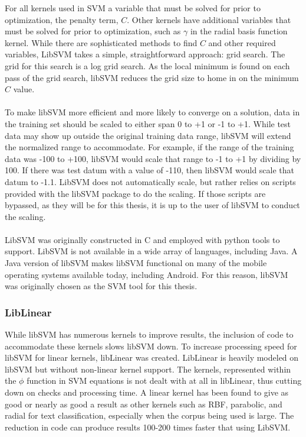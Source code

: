 		For all kernels used in SVM a variable that must be solved for prior to optimization, the penalty term, $C$.  Other kernels have additional variables that must be solved for prior to optimization, such as $\gamma$ in the radial basis function kernel.  While there are sophisticated methods to find $C$ and other required variables, LibSVM takes a simple, straightforward approach: grid search.  The grid for this search is a log grid search.  As the local minimum is found on each pass of the grid search, libSVM reduces the grid size to home in on the minimum $C$ value.  

			\paragraph{} To make libSVM more efficient and more likely to converge on a solution, data in the training set should be scaled to either span 0 to +1 or -1 to +1.  While test data may show up outside the original training data range, libSVM will extend the normalized range to accommodate.  For example, if the range of the training data was -100 to +100, libSVM would scale that range to -1 to +1 by dividing by 100.  If there was test datum with a value of -110, then libSVM would scale that datum to -1.1.  LibSVM does not automatically scale, but rather relies on scripts provided with the libSVM package to do the scaling.  If those scripts are bypassed, as they will be for this thesis, it is up to the user of libSVM to conduct the scaling.
		
			\paragraph{} LibSVM was originally constructed in C and employed with python tools to support.  LibSVM is not available in a wide array of languages, including Java.  A Java version of libSVM makes libSVM functional on many of the mobile operating systems available today, including Android.  For this reason, libSVM was originally chosen as the SVM tool for this thesis.


		\subsubsection{LibLinear}  While libSVM has numerous kernels to improve results, the inclusion of code to accommodate these kernels slows libSVM down.  To increase processing speed for libSVM for linear kernels, libLinear was created.  LibLinear is heavily modeled on libSVM but without non-linear kernel support.  The kernels, represented within the $\phi$ function in SVM equations is not dealt with at all in libLinear, thus cutting down on checks and processing time.   A linear kernel has been found to give as good or nearly as good a result as other kernels such as RBF, parabolic, and radial for text classification, especially when the corpus being used is large.  The reduction in code can produce results 100-200 times faster that using LibSVM.

